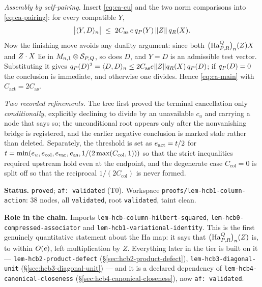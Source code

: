 \emph{Assembly by self-pairing.} Insert \eqref{eq:ca-cu} and the two norm comparisons into
\eqref{eq:ca-pairing}: for every compatible $Y$,
\[
  \bigl\lvert\langle Y,D\rangle_{n}\bigr\rvert\;\le\;2C_{\mathrm{as}}\,e\,q_{P}(Y)\,\lVert Z\rVert\,q_{R}(X).
\]
Now the finishing move avoids any duality argument: since both
$\bigl(\mathrm{Ha}^{Q}_{P,R}\bigr)_{n}(Z)X$ and $Z\mathbin{\cdot} X$ lie in $M_{n,1}\otimes\mathcal S_{P,Q}$, so does $D$,
and $Y=D$ is an admissible test vector. Substituting it gives
$q_{P}(D)^{2}=\langle D,D\rangle_{n}\le2C_{\mathrm{as}}e\lVert Z\rVert q_{R}(X)\,q_{P}(D)$; if
$q_{P}(D)=0$ the conclusion is immediate, and otherwise one divides. Hence
\eqref{eq:ca-main} with $C_{\mathrm{act}}=2C_{\mathrm{as}}$.

\emph{Two recorded refinements.} The tree first proved the terminal cancellation only
\emph{conditionally}, explicitly declining to divide by an unavailable $c_u$ and carrying
a node that says so; the unconditional root appears only after the nonvanishing bridge is
registered, and the earlier negative conclusion is marked stale rather than deleted.
Separately, the threshold is set as $e_{\mathrm{act}}=t/2$ for
$t=\min(e_u,e_{\mathrm{col}},e_{\mathrm{var}},e_{\mathrm{as}},1/(2\max(C_{\mathrm{col}},1)))$
so that the strict inequalities required upstream hold even at the endpoint, and the
degenerate case $C_{\mathrm{col}}=0$ is split off so that the reciprocal
$1/(2C_{\mathrm{col}})$ is never formed.

\medskip
\noindent\textbf{Status.} \texttt{proved}; \texttt{af: validated} (T0). Workspace
\texttt{proofs/lem-hcb1-column-action}: 38 nodes, all \texttt{validated}, root
\texttt{validated}, taint clean.

\noindent\textbf{Role in the chain.} Imports
\texttt{lem-hcb-column-hilbert-squared},
\texttt{lem-hcb0-compressed-associator} and
\texttt{lem-hcb1-variational-identity}. This is the first genuinely quantitative statement
about the Ha map: it says that $\bigl(\mathrm{Ha}^{Q}_{P,R}\bigr)_{n}(Z)$ is, to within $O(e)$, left
multiplication by $Z$. Everything later in the tier is built on it ---
\texttt{lem-hcb2-product-defect} (\S\ref{sec:hcb2-product-defect}),
\texttt{lem-hcb3-diagonal-unit} (\S\ref{sec:hcb3-diagonal-unit}) --- and it is a declared
dependency of \texttt{lem-hcb4-canonical-closeness}
(\S\ref{sec:hcb4-canonical-closeness}), now \texttt{af: validated}.
